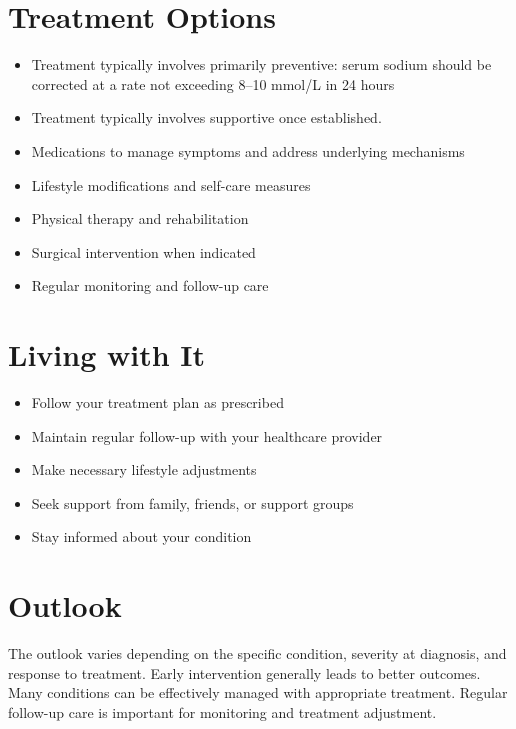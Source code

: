 \section{Treatment Options}
\begin{itemize}[noitemsep]
  \item Treatment typically involves primarily preventive: serum sodium should be corrected at a rate not exceeding 8--10 mmol/L in 24 hours
  \item Treatment typically involves supportive once established.
  \item Medications to manage symptoms and address underlying mechanisms
  \item Lifestyle modifications and self-care measures
  \item Physical therapy and rehabilitation
  \item Surgical intervention when indicated
  \item Regular monitoring and follow-up care
\end{itemize}
\section{Living with It}
\begin{itemize}[noitemsep]
  \item Follow your treatment plan as prescribed
  \item Maintain regular follow-up with your healthcare provider
  \item Make necessary lifestyle adjustments
  \item Seek support from family, friends, or support groups
  \item Stay informed about your condition
\end{itemize}
\section{Outlook}
The outlook varies depending on the specific condition, severity at diagnosis, and response to treatment. Early intervention generally leads to better outcomes. Many conditions can be effectively managed with appropriate treatment. Regular follow-up care is important for monitoring and treatment adjustment.
